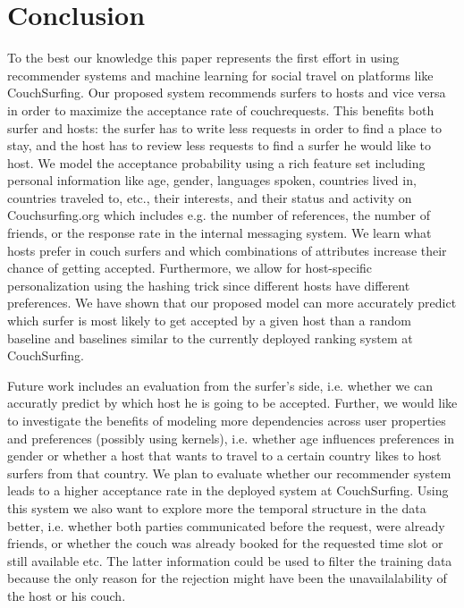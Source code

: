 \section{Conclusion} \label{sec:conclusion}

To the best our knowledge this paper represents the first effort in using recommender systems and machine learning for social travel on platforms like CouchSurfing.
Our proposed system recommends surfers to hosts and vice versa in order to maximize the acceptance rate of couchrequests. This benefits both surfer and hosts: the surfer has to write less requests in order to find a place to
stay, and the host has to review less requests to find a surfer he would like to host.
We model the acceptance probability using a rich feature set including personal information like age, gender, languages spoken, countries lived in, countries traveled to, etc., their interests, and their status and activity on Couchsurfing.org which includes e.g. the number of references, the number of friends, or the response rate in the internal messaging system.
We learn what hosts prefer in couch surfers and which combinations of attributes increase their chance of getting accepted. Furthermore, we allow for host-specific personalization using the hashing trick since different hosts have 
different preferences.
We have shown that our proposed model can more accurately predict which surfer is most likely to get accepted by a given host than a random baseline and baselines similar to the currently deployed ranking system at CouchSurfing.

Future work includes an evaluation from the surfer's side, i.e. whether we can accuratly predict by which host he is going to be accepted. Further, we would like to investigate the benefits of modeling more dependencies across user properties and preferences (possibly using kernels), i.e. whether age influences preferences in gender or whether a host that wants to travel to a certain country likes to host surfers from that country. We plan to evaluate whether our recommender system leads to a higher acceptance rate in the deployed system at CouchSurfing. Using this system we also want to explore more the temporal structure in the data better, i.e. whether both parties communicated before the request, were already friends, or whether the couch was already booked for the requested time slot or still available etc. The latter information could be used to filter the training data because the only reason for the rejection might have been the unavailalability of the host or his couch.
